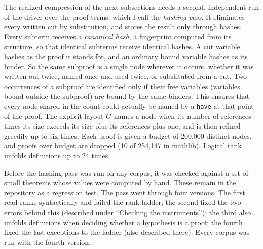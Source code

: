 \documentclass{article}
\begin{document}
The realized compression of the next subsections needs a second, independent run of the driver over the proof terms,
which I call the \textit{hashing pass}. It eliminates every written cut by substitution, and stores the result only through hashes. Every subterm receives a
\textit{canonical hash}, a fingerprint computed from its structure, so that identical subterms receive identical
hashes. A cut variable hashes as the proof it stands for, and an ordinary bound variable hashes as its binder. So the
same subproof is a single node wherever it occurs, whether it was written out twice, named once and used twice, or
substituted from a cut. Two occurrences of a subproof are identified only if their free variables (variables bound outside the subproof)
are bound by the same binders. This ensures that every node shared in the count could actually be named by a \texttt{have} at that
point of the proof. The explicit layout $G$ names a node when its number of references times its size exceeds its size
plus its references plus one, and is then refined greedily up to six times. Each proof is given a budget of 200,000
distinct nodes, and proofs over budget are dropped (10 of 254,147 in mathlib). Logical rank unfolds definitions up to
24 times.

Before the hashing pass was run on any corpus, it was checked against a set of small theorems whose values were
computed by hand. These remain in the repository as a regression test. The pass went through four versions. The
first read ranks syntactically and failed the rank ladder; the second fixed the two errors behind this (described
under ``Checking the instruments''); the third also unfolds definitions when deciding whether a hypothesis is a
proof; the fourth fixed the last exceptions to the ladder (also described there). Every corpus was run with the fourth version.
\end{document}
